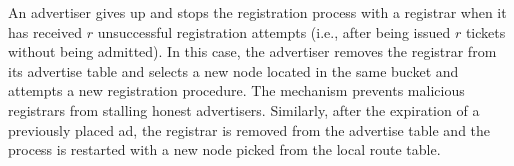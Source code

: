 An advertiser gives up and stops the registration process with a registrar when it has received $r$ unsuccessful registration attempts (i.e., after being issued $r$ tickets without being admitted). In this case, the advertiser removes the registrar from its advertise table and selects a new node located in the same bucket and attempts a new registration procedure. The mechanism prevents malicious registrars from stalling honest advertisers.
Similarly, after the expiration of a previously placed ad, the registrar is removed from the advertise table  and the process is restarted with a new node picked from the local route table.%
